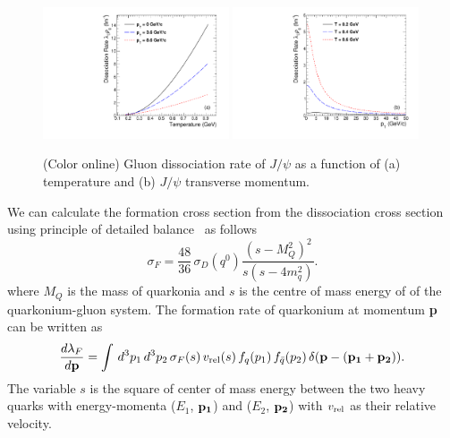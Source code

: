 \documentclass[12pt,a4paper,final]{iopart} %
\newcommand{\Jpsi}{J/\psi}
\begin{document}
\begin{figure}
\includegraphics[width=0.49\textwidth]{Fig2a_DRateVsT.pdf}
\includegraphics[width=0.49\textwidth]{Fig2b_DRateVsPt.pdf}
\caption{(Color online) Gluon dissociation rate of $\Jpsi$ as a function of (a) temperature and  
(b) $\Jpsi$ transverse momentum.}
\label{fig:DRateVsTempAndPt}
\end{figure}




We can calculate the formation cross section from the dissociation cross section
using principle of detailed balance~\cite{Thews:2000rj,Thews:2005vj} as follows
\begin{equation}
\sigma_{F} = \frac{48}{36}\,\sigma_{D}(q^0)\frac{(s-M_{Q}^2)^{2}}{s(s-4m_q^{2})}.
\end{equation}
where $M_{Q}$ is the mass of quarkonia and $s$ is the centre of mass energy of
of the quarkonium-gluon system.
The formation rate of quarkonium at momentum {\bf p} can be written as
\begin{equation}
\frac{d\lambda_{F}}{d{\rm\bf p}} = \int \,d^{3}p_1 \,d^{3}p_2 \,\sigma_{F}(s)\, v_{\rm rel}(s)\,f_{q}(p_1)\, f_{\bar{q}} (p_2)\,\delta({\rm\bf p}-( {\rm\bf p_1} + {\rm\bf p_2} )).
\end{equation}
The variable $s$ is the square of center of mass energy between the two heavy quarks with
energy-momenta ($E_1$, ${\rm\bf p_1}$) and ($E_2$, ${\rm\bf p_2}$) with $v_{\rm rel}$ as their
relative velocity.
\end{document}

